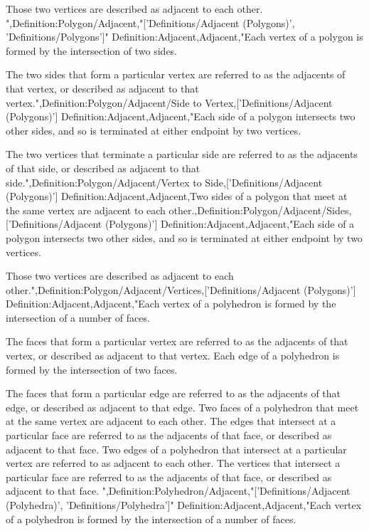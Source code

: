 Those two vertices are described as adjacent to each other.
",Definition:Polygon/Adjacent,"['Definitions/Adjacent (Polygons)', 'Definitions/Polygons']"
Definition:Adjacent,Adjacent,"Each vertex of a polygon is formed by the intersection of two sides.

The two sides that form a particular vertex are referred to as the adjacents of that vertex, or described as adjacent to that vertex.",Definition:Polygon/Adjacent/Side to Vertex,['Definitions/Adjacent (Polygons)']
Definition:Adjacent,Adjacent,"Each side of a polygon intersects two other sides, and so is terminated at either endpoint by two vertices.

The two vertices that terminate a particular side are referred to as the adjacents of that side, or described as adjacent to that side.",Definition:Polygon/Adjacent/Vertex to Side,['Definitions/Adjacent (Polygons)']
Definition:Adjacent,Adjacent,Two sides of a polygon that meet at the same vertex are adjacent to each other.,Definition:Polygon/Adjacent/Sides,['Definitions/Adjacent (Polygons)']
Definition:Adjacent,Adjacent,"Each side of a polygon intersects two other sides, and so is terminated at either endpoint by two vertices.


Those two vertices are described as adjacent to each other.",Definition:Polygon/Adjacent/Vertices,['Definitions/Adjacent (Polygons)']
Definition:Adjacent,Adjacent,"Each vertex of a polyhedron is formed by the intersection of a number of faces.

The faces that form a particular vertex are referred to as the adjacents of that vertex, or described as adjacent to that vertex.
Each edge of a polyhedron is formed by the intersection of two faces.

The faces that form a particular edge are referred to as the adjacents of that edge, or described as adjacent to that edge.
Two faces of a polyhedron that meet at the same vertex are adjacent to each other.
The edges that intersect at a particular face are referred to as the adjacents of that face, or described as adjacent to that face.
Two edges of a polyhedron that intersect at a particular vertex are referred to as adjacent to each other.
The vertices that intersect a particular face are referred to as the adjacents of that face, or described as adjacent to that face.
",Definition:Polyhedron/Adjacent,"['Definitions/Adjacent (Polyhedra)', 'Definitions/Polyhedra']"
Definition:Adjacent,Adjacent,"Each vertex of a polyhedron is formed by the intersection of a number of faces.

